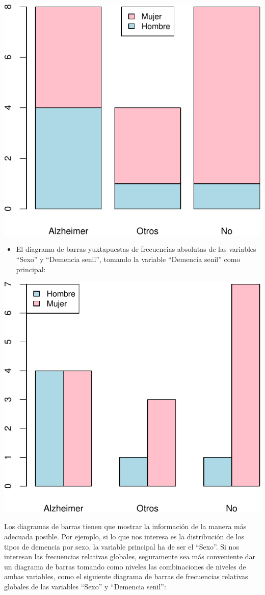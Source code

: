 \documentclass[
]{book}
\providecommand{\tightlist}{%
  \setlength{\itemsep}{0pt}\setlength{\parskip}{0pt}}
\theoremstyle{definition}
\theoremstyle{definition}
\theoremstyle{definition}
\theoremstyle{definition}
\theoremstyle{remark}
\begin{document}
\begin{center}\includegraphics[width=0.5\linewidth]{INREMDN_files/figure-latex/unnamed-chunk-231-1} \end{center}

\begin{itemize}
\tightlist
\item
  El diagrama de barras yuxtapuestas de frecuencias absolutas de las variables ``Sexo'' y ``Demencia senil'', tomando la variable ``Demencia senil'' como principal:
\end{itemize}

\begin{center}\includegraphics[width=0.5\linewidth]{INREMDN_files/figure-latex/unnamed-chunk-232-1} \end{center}

Los diagramas de barras tienen que mostrar la información de la manera más adecuada posible. Por ejemplo, si lo que nos interesa es la distribución de los tipos de demencia por sexo, la variable principal ha de ser el ``Sexo''. Si nos interesan las frecuencias relativas globales, seguramente sea más conveniente dar un diagrama de barras tomando como niveles las combinaciones de niveles de ambas variables, como el siguiente diagrama de barras de frecuencias relativas globales de las variables ``Sexo'' y ``Demencia senil'':
\end{document}
